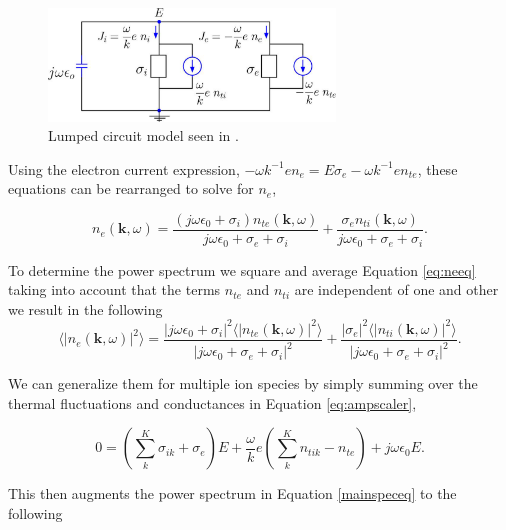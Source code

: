 \documentclass[10pt]{report}
\begin{document}
\begin{figure}[!h]
\centering
\includegraphics[width=3.0in]{circuit}
\caption{Lumped circuit model seen in  \cite{kudeki:milla:1}.}
\label{fig:circuit}
\end{figure}

\noindent Using the electron current expression, $-\omega k^{-1}en_e = E\sigma_e -\omega k^{-1}en_{te}$, these equations can be rearranged to solve for $n_e$, 

\begin{equation}
\label{eq:neeq}
n_e(\mathbf{k},\omega) =  \frac{(j\omega\epsilon_0 + \sigma_i) n_{te}(\mathbf{k},\omega)}{j\omega\epsilon_0 +\sigma_e+\sigma_i} + \frac{\sigma_en_{ti}(\mathbf{k},\omega)}{j\omega\epsilon_0 +\sigma_e+\sigma_i}.
\end{equation}

\noindent To determine the power spectrum we square and average Equation \ref{eq:neeq} taking into account that the terms $n_{te}$ and $n_{ti}$ are independent of one and other we result in the following
\begin{equation}
\label{mainspeceq}
\langle \left|n_e(\mathbf{k},\omega)\right|^2\rangle = \frac{|j\omega\epsilon_0 + \sigma_i|^2 \langle |n_{te}(\mathbf{k},\omega)|^2\rangle}{|j\omega\epsilon_0 +\sigma_e+\sigma_i|^2} + \frac{| \sigma_e|^2 \langle |n_{ti}(\mathbf{k},\omega)|^2\rangle}{|j\omega\epsilon_0 +\sigma_e+\sigma_i|^2}.
\end{equation}

We can generalize them for multiple ion species by simply summing over the thermal fluctuations and conductances in Equation \ref{eq:ampscaler},

\begin{equation} 
\label{eq:ampscalersum}
0=\left(\displaystyle \sum_k^K\sigma_{ik} +\sigma_e\right)E +\frac{\omega}{k}e\left(\sum_k^Kn_{tik}-n_{te}\right) +j\omega \epsilon_0 E.
\end{equation}

\noindent This then augments the power spectrum in Equation \ref{mainspeceq} to the following
\end{document}
